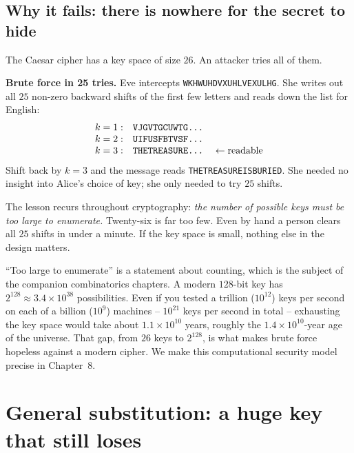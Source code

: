 \subsection{Why it fails: there is nowhere for the secret to hide}

The Caesar cipher has a key space of size $26$. An attacker tries all of them.

\begin{attackbox}
\textbf{Brute force in 25 tries.} Eve intercepts \texttt{WKHWUHDVXUHLVEXULHG}. She writes out
all $25$ non-zero backward shifts of the first few letters and reads down the list for English:
\[
\begin{array}{rl}
k=1: & \texttt{VJGVTGCUWTG\dots}\\
k=2: & \texttt{UIFUSFBTVSF\dots}\\
k=3: & \texttt{THETREASURE\dots}\quad\leftarrow\text{readable}
\end{array}
\]
Shift back by $k=3$ and the message reads \texttt{THETREASUREISBURIED}. She needed no
insight into Alice's choice of key; she only needed to try $25$ shifts.
\end{attackbox}

The lesson recurs throughout cryptography: \emph{the number of possible keys must
be too large to enumerate.} Twenty-six is far too few. Even by hand a person clears all $25$
shifts in under a minute. If the key space is small, nothing else in the design matters.

\begin{connectionbox}
``Too large to enumerate'' is a statement about counting, which is the subject of the
companion combinatorics chapters. A modern $128$-bit key has $2^{128}\approx 3.4\times10^{38}$
possibilities. Even if you tested a trillion ($10^{12}$) keys per second on each of a billion
($10^{9}$) machines -- $10^{21}$ keys per second in total -- exhausting the key space would
take about $1.1\times 10^{10}$ years, roughly the $1.4\times 10^{10}$-year age of the universe.
That gap, from $26$ keys to $2^{128}$, is what makes brute force hopeless against a modern
cipher. We make this computational security model precise in Chapter~8.
\end{connectionbox}

\section{General substitution: a huge key that still loses}
\label{ch02:substitution}


